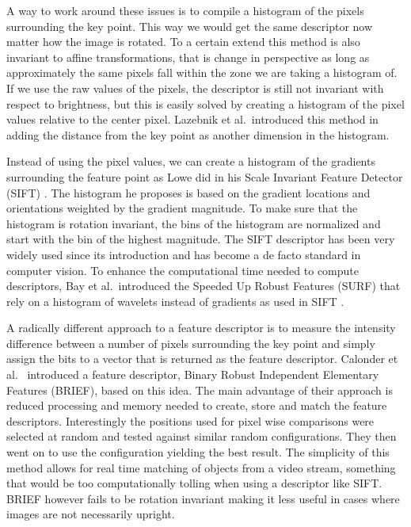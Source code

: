 A way to work around these issues is to compile a histogram of the 
pixels surrounding the key point. This way we would get the same 
descriptor now matter how the image is rotated. To a certain extend this
method is also invariant to affine transformations, that is change in 
perspective as long as approximately the same pixels fall within the 
zone we are taking a histogram of. If we use the raw values of the 
pixels, the descriptor is still not invariant with respect to 
brightness, but this is easily solved by creating a histogram of the 
pixel values relative to the center pixel. Lazebnik et al.\ introduced 
this method in \cite{lazebnik2003sparse} adding the distance from the 
key point as another dimension in the histogram.

Instead of using the pixel values, we can create a histogram of the 
gradients surrounding the feature point as Lowe did in his Scale 
Invariant Feature Detector (SIFT) \cite{lowe2004sift}. The histogram he 
proposes is based on the gradient locations and orientations weighted by
the gradient magnitude. To make sure that the histogram is rotation 
invariant, the bins of the histogram are normalized and start with the 
bin of the highest magnitude. The SIFT descriptor has been very widely 
used since its introduction and has become a de facto standard in 
computer vision. To enhance the computational time needed to compute 
descriptors, Bay et al.\ introduced the Speeded Up Robust Features 
(SURF) that rely on a histogram of wavelets instead of gradients as used 
in SIFT \cite{bay2006surf}. 

A radically different approach to a feature descriptor is to measure the
intensity difference between a number of pixels surrounding the key 
point and simply assign the bits to a vector that is returned as the 
feature descriptor. Calonder et al.\ \cite{calonder2010brief} introduced 
a feature descriptor, Binary Robust Independent Elementary Features 
(BRIEF), based on this idea. The main advantage of their approach is 
reduced processing and memory needed to create, store and match the 
feature descriptors. Interestingly the positions used for pixel wise 
comparisons were selected at random and tested against similar random 
configurations. They then went on to use the configuration yielding the 
best result.  The simplicity of this method allows for real time 
matching of objects from a video stream, something that would be too 
computationally tolling when using a descriptor like SIFT\@. BRIEF 
however fails to be rotation invariant making it less useful in cases 
where images are not necessarily upright.

